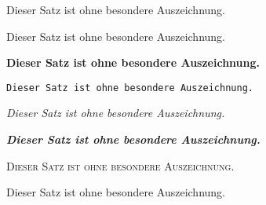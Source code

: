 \documentclass[ngerman,12pt]{scrartcl}
\begin{document}
\textrm{Dieser Satz ist ohne besondere Auszeichnung.} %

\textsf{Dieser Satz ist ohne besondere Auszeichnung.} %

\textbf{Dieser Satz ist ohne besondere Auszeichnung.} %

\texttt{Dieser Satz ist ohne besondere Auszeichnung.} %

\textit{Dieser Satz ist ohne besondere Auszeichnung.} %

\textbf{\textit{Dieser Satz ist ohne besondere Auszeichnung.}} %

\textsc{Dieser Satz ist ohne besondere Auszeichnung.} %

\textnormal{Dieser Satz ist ohne besondere Auszeichnung.}
\end{document}
